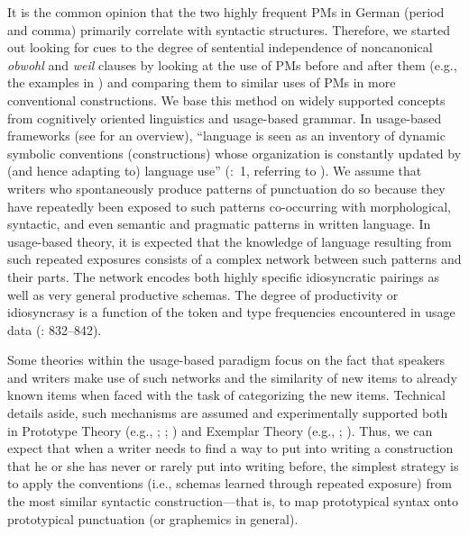\begin{styleMoutonText}
It is the common opinion that the two highly frequent PMs in German (period and comma) primarily correlate with syntactic structures. Therefore, we started out looking for cues to the degree of sentential independence of noncanonical \textit{obwohl} and \textit{weil} clauses by looking at the use of PMs before and after them (e.g., the examples in ) and comparing them to similar uses of PMs in more conventional constructions. We base this method on widely supported concepts from cognitively oriented linguistics and usage-based grammar. In usage-based frameworks (see \citealt{BybeeBeckner2009} for an overview), “language is seen as an inventory of dynamic symbolic conventions (constructions) whose organization is constantly updated by (and hence adapting to) language use” (\citealt{Zeschel2008}:~1, referring to \citealt{Langacker2000}). We assume that writers who spontaneously produce patterns of punctuation do so because they have repeatedly been exposed to such patterns co-occurring with morphological, syntactic, and even semantic and pragmatic patterns in written language. In usage-based theory, it is expected that the knowledge of language resulting from such repeated exposures consists of a complex network between such patterns and their parts. The network encodes both highly specific idiosyncratic pairings as well as very general productive schemas. The degree of productivity or idiosyncrasy is a function of the token and type frequencies encountered in usage data (\citealt{BybeeBeckner2009}: 832–842).
\end{styleMoutonText}

\begin{styleMoutonText}
Some theories within the usage-based paradigm focus on the fact that speakers and writers make use of such networks and the similarity of new items to already known items when faced with the task of categorizing the new items. Technical details aside, such mechanisms are assumed and experimentally supported both in Prototype Theory (e.g., \citealt{Rosch1973}; \citealt{RoschEtAl1976}; \citealt{Rosch1978}) and Exemplar Theory (e.g., \citealt{MedinSchaffer1978}; \citealt{Hintzman1986}). Thus, we can expect that when a writer needs to find a way to put into writing a construction that he or she has never or rarely put into writing before, the simplest strategy is to apply the conventions (i.e., schemas learned through repeated exposure) from the most similar syntactic construction—that is, to map prototypical syntax onto prototypical punctuation (or graphemics in general).
\end{styleMoutonText}

